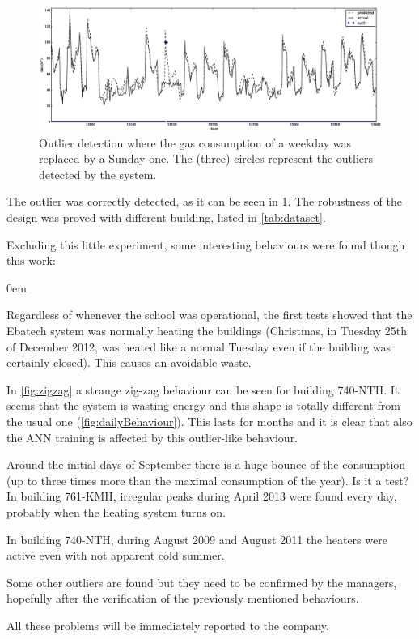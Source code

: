 \documentclass{sig-alternate-sigmod07}
\begin{document}
\begin{figure}
\centering
\includegraphics[width=\textwidth]{images/outliersReal.eps}
\caption{Outlier detection where the gas consumption of a weekday was replaced by a Sunday one. The (three) circles represent the outliers detected by the system.}
\label{fig:outlierReal}
\end{figure}

The outlier was correctly detected, as it can be seen in \cref{fig:outlierReal}. The robustness of the design was proved with different building, listed in \cref{tab:dataset}.

Excluding this little experiment, some interesting behaviours were found though this work:
\begin{description}
\itemsep0em
  \item[Holidays] Regardless of whenever the school was operational, the first tests showed that the Ebatech system was normally heating the buildings (Christmas, in Tuesday 25th of December 2012, was heated like a normal Tuesday even if the building was certainly closed). This causes an avoidable waste.
  \item[Consumption bounces] In \cref{fig:zigzag} a strange zig-zag behaviour can be seen for building 740-NTH. It seems that the system is wasting energy and this shape is totally different from the usual one (\cref{fig:dailyBehaviour}). This lasts for months and it is clear that also the ANN training is affected by this outlier-like behaviour.
\item[Peaks] Around the initial days of September there is a huge bounce of the consumption (up to three times more than the maximal consumption of the year). Is it a test?
In building 761-KMH, irregular peaks during April 2013 were found every day, probably when the heating system turns on.
\item[August with heaters] In building 740-NTH, during August 2009 and August 2011 the heaters were active even with not apparent cold summer.
\item[Outliers] Some other outliers are found but they need to be confirmed by the managers, hopefully after the verification of the previously mentioned behaviours.
\end{description}
All these problems will be immediately reported to the company.
\end{document}
